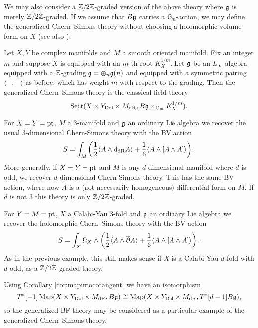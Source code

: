 \documentclass[10pt, oneside]{article}
\newcommand{\Gm}{\mathbb{G}_m}
\newcommand{\Sect}{\mathrm{Sect}}
\begin{document}
We may also consider a $\mathbb Z/2\mathbb Z$-graded version of the above theory where $\mathfrak g$ is merely $\mathbb Z/2\mathbb Z$-graded. If we assume that $B\mathfrak g$ carries a $\Gm$-action, we may define the generalized Chern--Simons theory without choosing a holomorphic volume form on $X$ (see also \cite{GinzburgRozenblyum}).

\begin{definition}
Let $X,Y$ be complex manifolds and $M$ a smooth oriented manifold. Fix an integer $m$ and suppose $X$ is equipped with an $m$-th root $K_X^{1/m}$. Let $\mathfrak g$ be an $L_\infty$ algebra equipped with a $\mathbb Z$-grading $\mathfrak g=\oplus_n \mathfrak g(n)$ and equipped with a symmetric pairing $\langle -, -\rangle$ as before, which has weight $m$ with respect to the grading. Then the generalized Chern--Simons theory is the classical field theory
\[\Sect(X\times Y_{\mathrm{Dol}}\times M_{\mathrm{dR}}, B\fg\times_{\Gm} K_X^{1/m}).\]
\label{def:sectChernSimons}
\end{definition}

\begin{example}
For $X=Y=\operatorname{pt}$, $M$ a 3-manifold and $\mathfrak g$ an ordinary Lie algebra we recover the usual 3-dimensional Chern-Simons theory with the BV action
\[S = \int_M \left(\frac{1}{2}\langle A\wedge {\rm d}_{\mathrm{dR}} A\rangle + \frac{1}{6}\langle A\wedge [A\wedge A]\rangle\right).\]
More generally, if $X=Y=\operatorname{pt}$ and $M$ is any $d$-dimensional manifold where $d$ is odd, we recover $d$-dimensional Chern-Simons theory.  This has the same BV action, where now $A$ is a (not necessarily homogeneous) differential form on $M$.  If $d$ is not 3 this theory is only $\mathbb Z/2\mathbb Z$-graded.
\end{example}

\begin{example}
For $Y=M=\operatorname{pt}$, $X$ a Calabi-Yau 3-fold and $\mathfrak g$ an ordinary Lie algebra we recover the holomorphic Chern--Simons theory with the BV action
\[S = \int_X \Omega_X\wedge \left(\frac{1}{2}\langle A\wedge \overline{\partial} A\rangle + \frac{1}{6}\langle A\wedge [A\wedge A]\rangle\right).\]
As in the previous example, this still makes sense if $X$ is a Calabi-Yau $d$-fold with $d$ odd, as a $\mathbb Z/2\mathbb Z$-graded theory.
\end{example}

\begin{example}
Using Corollary \ref{cor:mapintocotangent} we have an isomorphism
\[T^*[-1]\operatorname{Map}(X\times Y_{\mathrm{Dol}}\times M_{\mathrm{dR}}, B\mathfrak g)\cong \operatorname{Map}(X\times Y_{\mathrm{Dol}}\times M_{\mathrm{dR}}, T^*[d-1]B\mathfrak g),\]
so the generalized BF theory may be considered as a particular example of the generalized Chern--Simons theory.
\label{ex:CSBF}
\end{example}
\end{document}

